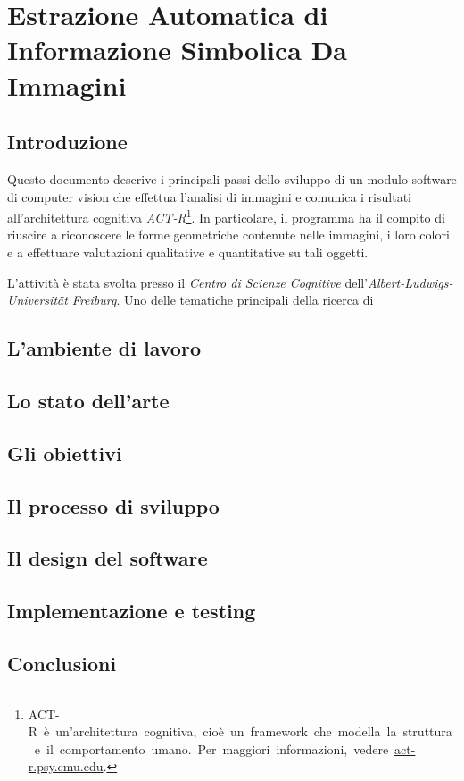 \chapter*{Estrazione Automatica di Informazione Simbolica Da Immagini}
	
	\section*{Introduzione}
	Questo documento descrive i principali passi dello sviluppo di un modulo software di computer vision che effettua l'analisi di immagini e comunica i risultati all'architettura cognitiva \mbox{\emph{ACT-R}\footnote{ACT-R è un'architettura cognitiva, cioè un framework che modella la struttura e il comportamento umano. Per maggiori informazioni, vedere~\url{act-r.psy.cmu.edu}.}}.
	In particolare, il programma ha il compito di riuscire a riconoscere le forme geometriche contenute nelle immagini, i loro colori e a effettuare valutazioni qualitative e quantitative su tali oggetti.

	L'attività è stata svolta presso il \emph{Centro di Scienze Cognitive} dell'\emph{Albert-Ludwigs-Universität Freiburg}.
	Uno delle tematiche principali della ricerca di 
	 
			
	\section*{L'ambiente di lavoro}


	\section*{Lo stato dell'arte}


	\section*{Gli obiettivi}


	\section*{Il processo di sviluppo}


	\section*{Il design del software}


	\section*{Implementazione e testing}
	

	\section*{Conclusioni}

